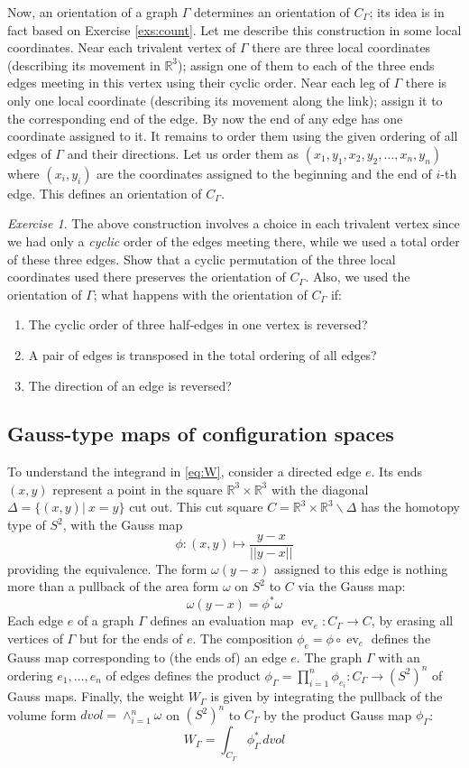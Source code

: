 \documentclass[10pt]{amsart}
\theoremstyle{definition}
\theoremstyle{remark}
\newtheorem{exs}[thm]{Exercise}
\newcommand{\R}{\mathbb R}
\newcommand{\sminus}{\smallsetminus}
\newcommand{\dvol}{dvol}
\newcommand{\GD}{\Delta}
\newcommand{\GG}{\Gamma}
\newcommand{\Go}{\omega}
\newcommand{\ev}{\operatorname{ev}}
\begin{document}
Now, an orientation of a graph $\GG$ determines an orientation of
$C_\GG$; its idea is in fact based on Exercise \ref{exs:count}.
Let me describe this construction in some local coordinates. Near
each trivalent vertex of $\GG$ there are three local coordinates
(describing its movement in $\R^3$); assign one of them to each of
the three ends edges meeting in this vertex using their cyclic
order. Near each leg of $\GG$ there is only one local coordinate
(describing its movement along the link); assign it to the
corresponding end of the edge. By now the end of any edge has one
coordinate assigned to it. It remains to order them using the
given ordering of all edges of $\GG$ and their directions. Let us
order them as $(x_1,y_1,x_2,y_2,\dots,x_n,y_n)$ where $(x_i,y_i)$
are the coordinates assigned to the beginning and the end of
$i$-th edge. This defines an orientation of $C_\GG$.

\begin{exs}
The above construction involves a choice in each trivalent vertex
since we had only a {\em cyclic} order of the edges meeting there,
while we used a total order of these three edges. Show that a
cyclic permutation of the three local coordinates used there
preserves the orientation of $C_\GG$. Also, we used the
orientation of $\GG$; what happens with the orientation of $C_\GG$
if:
\begin{enumerate}
\item
The cyclic order of three half-edges in one vertex is reversed?
\item
A pair of edges is transposed in the total ordering of all edges?
\item
The direction of an edge is reversed?
\end{enumerate}
\end{exs}

\subsection{Gauss-type maps of configuration spaces}
To understand the integrand in \eqref{eq:W}, consider a directed
edge $e$. Its ends $(x,y)$ represent a point in the square
$\R^3\times\R^3$ with the diagonal $\GD=\{(x,y)|\ x=y\}$ cut out.
This cut square $C=\R^3\times\R^3\sminus\GD$ has the homotopy type
of $S^2$, with the Gauss map $$\phi:(x,y)\mapsto \frac{y-x}
{||y-x||}$$ providing the equivalence. The form $\Go(y-x)$
assigned to this edge is nothing more than a pullback of the area
form $\Go$ on $S^2$ to $C$ via the Gauss map: $$\Go(y-x)=\phi^*
\Go$$ Each edge $e$ of a graph $\GG$ defines an evaluation map
$\ev_e:C_\GG\to C$, by erasing all vertices of $\GG$ but for the
ends of $e$. The composition $\phi_e=\phi\circ\ev_e$ defines the
Gauss map corresponding to (the ends of) an edge $e$. The graph
$\GG$ with an ordering $e_1,\dots,e_n$ of edges defines the
product
$\phi_\GG=\prod_{i=1}^n\phi_{e_i}:C_\GG\to(S^2)^n$ of Gauss maps.
Finally, the weight $W_\GG$ is given by integrating the pullback
of the volume form $\dvol =\wedge_{i=1}^n\Go$ on $(S^2)^n$ to
$C_\GG$ by the product Gauss map $\phi_\GG$:
\begin{equation}\label{eq:degree}
W_\GG=\int_{C_\GG}\phi_\GG^*\, \dvol
\end{equation}
\end{document}
